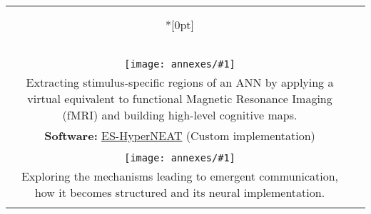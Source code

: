 \documentclass[a4paper,12pt,final]{article}
\makeatletter
\newcommand{\prettyuline}[1]{%
 \uline{\phantom{#1}}%
 \llap{\contour{white}{#1}}%
}
\newlength\lwidth
\newlength\rwidth
\newlength\titlewidth
\newlength\titleoffset
\newenvironment{sect}[2][{\\*[0pt]}]{%
 \def\title{\Large\prettyuline{\texttt{\textbf{#2}}}}%
 \setlength{\titlewidth}{\widthof{\title}}%
 \setlength{\titleoffset}{\maxof{0pt}{\lwidth-\titlewidth*\real{0.5}}}%
%  
 \begin{longtable}{@{}c|c@{}}%
  \multicolumn{2}{l}{\hspace{\titleoffset}\title}\vspace{-2.9pt}\\*#1%
}{%
 \end{longtable}%
}%
\def\dbgrule{}
\newcommand{\itm}[3]{%
\dbgrule%
 \makecell[t{p{\lwidth}}]{%
  \raggedleft%
  \ifx\hfuzz#1\hfuzz\else%
   \textbf{#1}%
   \ifx\hfuzz#2\hfuzz\else\\\fi%
  \fi%
  #2%
 } & \makecell[t{p{\rwidth}}]{#3} \\
\dbgrule
}
\makeatother
\begin{document}
\newcommand{\ritm}[5]{%
 \itm{}{%
  \begin{minipage}[t]{\lwidth}%
   \vspace{0pt}%
   \raggedleft
   \texttt{[image: annexes/\#1]}%
  \end{minipage}%
 }{%
  \begin{minipage}[t]{\rwidth}%
   \vspace{0pt}\small%
   \cite{#4} \textsc{\En{#2}\Fr{#3}} \\%
   #5%
  \end{minipage}%
 }
}
\newcommand{\sref}[3][Software]{\textbf{#1:} \href{#2}{#3}}
\begin{sect}{Research}
 \itm{Synopsis}{}{%
  \small My main interests revolve around the production of autonomous artificial life forms: from the autonomous design of efficient morphologies to the emergence of high-level control schemes and the evolutionary constraints that favor both.
  The former and latter were investigated throughout my thesis whereas my more recent work deals with Artificial Neural Networks (ANN), with a special focus on the transition from communication to language and its neural implementation.
 }
 \\
 
 \itm{Artificial Neural Networks}{}{
  Studying the emergence of various ``cognitive'' capabilities in virtual robots, controlled by a spontaneously differentiated neural network, in response to biologically plausible stimuli.
 }
 \ritm{ann_vfmri_colored}{Virtual fMRI}{IRMf virtuelle}{GodinDubois2021a,GodinDubois2023a}{
  Extracting stimulus-specific regions of an ANN by applying a virtual equivalent to functional Magnetic Resonance Imaging (fMRI) and building high-level cognitive maps. \\
  \sref{https://github.com/kgd-al/ES-HyperNEAT}{ES-HyperNEAT} (Custom implementation)
 }
 \ritm{communication}{Communication}{Communication}{GodinDubois2021b,GodinDubois2022a}{
  Exploring the mechanisms leading to emergent communication, how it becomes structured and its neural implementation.
 }
 \\[.5em]


\end{sect}
\end{document}
